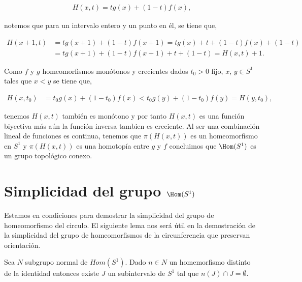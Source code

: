\begin{align*}
H(x,t)=tg(x)+(1-t)f(x),
\end{align*}

notemos que para un intervalo entero y un punto en él, se tiene que, 

\begin{align*}
H(x+1,t) & = tg(x+1)+(1-t)f(x+1)= tg(x)+t+(1-t)f(x)+(1-t) \\
& = tg(x+1)+(1-t)f(x+1) + t +(1-t)= H(x,t)+1.
\end{align*} 

Como $f$ y $g$ homeomorfismos  monótonos y crecientes dados $t_0 >0$ fijo, $x$, $y \in S^1$ tales que $x <y$ se tiene que, 

\begin{align*}
H(x,t_0) & = t_0g(x)+(1-t_0)f(x) < t_0g(y)+(1-t_0)f(y)=H(y,t_0),
\end{align*} 

tenemos $H(x,t)$ también es monótono y por tanto $H(x,t)$ es una función biyectiva más aún la función inversa tambien es creciente. Al ser una combinación lineal de funciones es continua, tenemos que $\pi(H(x,t))$ es un homeomorfismo en $S^1$ y $\pi(H(x,t))$ es una homotopía entre $g$ y $f$ concluimos que $\Hom(S^1)$ es un grupo topológico conexo. 

\section*{Simplicidad del grupo $\Hom(S^1)$}
Estamos en condiciones para demostrar la simplicidad del grupo de homeomorfismo del circulo. El siguiente lema nos será útil en la demostración de la simplicidad del grupo de homeomorfismos de la circunferencia que preservan orientación. 


\begin{lm}
Sea $N$ subgrupo normal de $Hom(S^1)$. Dado $n \in N$ un homemorfismo distinto de la identidad entonces existe $J$ un subintervalo de $S^1$ tal que  $
n(J) \cap J = \emptyset.$
\end{lm}

